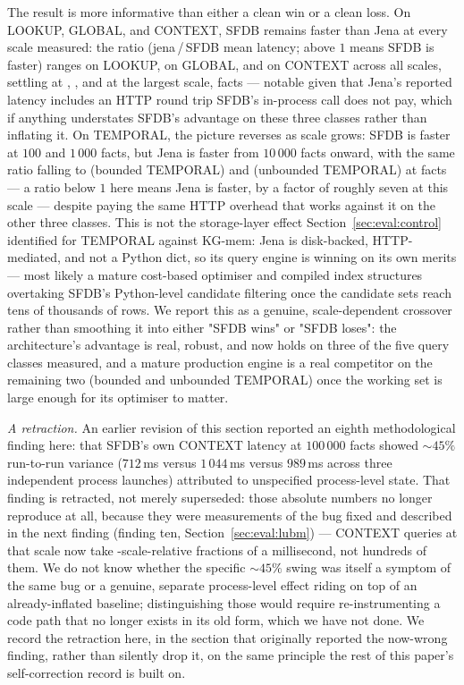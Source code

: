 

The result is more informative than either a clean win or a clean loss.
On LOOKUP, GLOBAL, and CONTEXT, SFDB remains faster than Jena at every
scale
measured: the ratio (jena\,/\,SFDB mean latency; above $1$ means SFDB is
faster) ranges \rangelookupjena{} on LOOKUP, \rangeglobaljena{} on
GLOBAL, and \rangecontextjena{} on CONTEXT across all scales, settling at \lookupjenalarge{},
\globaljenalarge{}, and \contextjenalarge{} at the largest scale, \jenalargescale{} facts ---
notable given that Jena's reported latency includes an HTTP round trip
SFDB's in-process call does not pay, which if anything understates
SFDB's advantage on these three classes rather than inflating it. On
TEMPORAL, the picture reverses as scale grows: SFDB is
faster at $100$ and $1\,000$ facts, but Jena is faster from $10\,000$
facts onward, with the same ratio falling to
\temporaljenalarge{} (bounded TEMPORAL) and
\temporalunbjenalarge{} (unbounded TEMPORAL) at \jenalargescale{} facts
--- a ratio below $1$ here means Jena is faster, by a factor of roughly
seven at this scale --- despite paying the same HTTP overhead
that works against it on the other three classes. This is not the storage-layer effect
Section~\ref{sec:eval:control} identified for TEMPORAL
against KG-mem: Jena is disk-backed, HTTP-mediated, and not a Python
dict, so its query engine is winning on its own merits --- most likely a
mature cost-based optimiser and compiled index structures overtaking
SFDB's Python-level candidate filtering once the candidate sets reach
tens of thousands of rows. We report this as a genuine, scale-dependent crossover
rather than smoothing it into either "SFDB wins" or "SFDB loses": the
architecture's advantage is real, robust, and now holds on three of the
five query classes measured, and a mature production engine is a real
competitor on the remaining two (bounded and unbounded TEMPORAL) once
the working set is large enough for
its optimiser to matter.

\emph{A retraction.} An earlier revision of this section reported an
eighth methodological finding here: that SFDB's own CONTEXT latency at
$100\,000$ facts showed $\sim\!45\%$ run-to-run variance ($712$\,ms
versus $1\,044$\,ms versus $989$\,ms across three independent process
launches) attributed to unspecified process-level state. That finding
is retracted, not merely superseded: those absolute numbers no longer
reproduce at all, because they were measurements of the bug fixed and
described in the next finding (finding ten, Section~\ref{sec:eval:lubm}) ---
CONTEXT queries at that scale now take
\contextjenalarge{}-scale-relative fractions of a millisecond, not
hundreds of them. We do not know whether the specific $\sim\!45\%$
swing was itself a symptom of the same bug or a genuine, separate
process-level effect riding on top of an already-inflated baseline;
distinguishing those would require re-instrumenting a code path that no
longer exists in its old form, which we have not done. We record the
retraction here, in the section that originally reported the now-wrong
finding, rather than silently drop it, on the same principle the rest
of this paper's self-correction record is built on.

